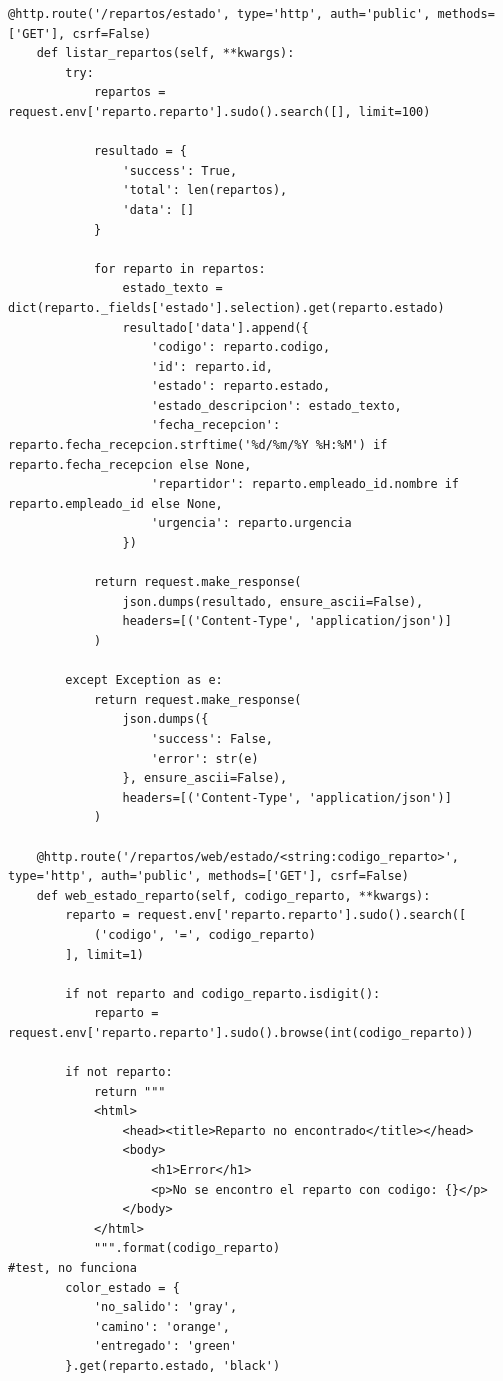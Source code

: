 \documentclass[a4paper, 11pt]{article}
\begin{document}
\begin{lstlisting}[frame=single,breaklines=true]
    @http.route('/repartos/estado', type='http', auth='public', methods=['GET'], csrf=False)
    def listar_repartos(self, **kwargs):
        try:
            repartos = request.env['reparto.reparto'].sudo().search([], limit=100)
            
            resultado = {
                'success': True,
                'total': len(repartos),
                'data': []
            }
            
            for reparto in repartos:
                estado_texto = dict(reparto._fields['estado'].selection).get(reparto.estado)
                resultado['data'].append({
                    'codigo': reparto.codigo,
                    'id': reparto.id,
                    'estado': reparto.estado,
                    'estado_descripcion': estado_texto,
                    'fecha_recepcion': reparto.fecha_recepcion.strftime('%d/%m/%Y %H:%M') if reparto.fecha_recepcion else None,
                    'repartidor': reparto.empleado_id.nombre if reparto.empleado_id else None,
                    'urgencia': reparto.urgencia
                })
            
            return request.make_response(
                json.dumps(resultado, ensure_ascii=False),
                headers=[('Content-Type', 'application/json')]
            )
            
        except Exception as e:
            return request.make_response(
                json.dumps({
                    'success': False,
                    'error': str(e)
                }, ensure_ascii=False),
                headers=[('Content-Type', 'application/json')]
            )

    @http.route('/repartos/web/estado/<string:codigo_reparto>', type='http', auth='public', methods=['GET'], csrf=False)
    def web_estado_reparto(self, codigo_reparto, **kwargs):
        reparto = request.env['reparto.reparto'].sudo().search([
            ('codigo', '=', codigo_reparto)
        ], limit=1)
        
        if not reparto and codigo_reparto.isdigit():
            reparto = request.env['reparto.reparto'].sudo().browse(int(codigo_reparto))
        
        if not reparto:
            return """
            <html>
                <head><title>Reparto no encontrado</title></head>
                <body>
                    <h1>Error</h1>
                    <p>No se encontro el reparto con codigo: {}</p>
                </body>
            </html>
            """.format(codigo_reparto)
#test, no funciona 
        color_estado = {
            'no_salido': 'gray',
            'camino': 'orange',
            'entregado': 'green'
        }.get(reparto.estado, 'black')
        

\end{lstlisting}
\end{document}
